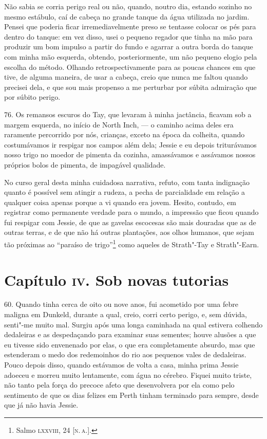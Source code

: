 Não sabia se corria perigo real ou não, quando, noutro dia, estando
sozinho no mesmo estábulo, caí de cabeça no grande tanque da água
utilizada no jardim. Pensei que poderia ficar irremediavelmente preso se
tentasse colocar os pés para dentro do tanque: em vez disso, usei o
pequeno regador que tinha na mão para produzir um bom impulso a partir
do fundo e agarrar a outra borda do tanque com minha mão esquerda,
obtendo, posteriormente, um não pequeno elogio pela escolha do método.
Olhando retrospectivamente para as poucas chances em que tive, de alguma
maneira, de usar a cabeça, creio que nunca me faltou quando precisei
dela, e que sou mais propenso a me perturbar por súbita admiração que
por súbito perigo.

76. Os remansos escuros do Tay, que levaram à minha jactância, ficavam
sob a margem esquerda, no início de North Inch, --- o caminho acima deles
era raramente percorrido por nós, crianças, exceto na época da colheita,
quando costumávamos ir respigar nos campos além dela; Jessie e eu depois
triturávamos nosso trigo no moedor de pimenta da cozinha, amassávamos e
assávamos nossos próprios bolos de pimenta, de impagável qualidade.

No curso geral desta minha cuidadosa narrativa, refuto, com tanta
indignação quanto é possível sem atingir a rudeza, a pecha de
parcialidade em relação a qualquer coisa apenas porque a vi quando era
jovem. Hesito, contudo, em registrar como permanente verdade para o
mundo, a impressão que ficou quando fui respigar com Jessie, de que as
gavelas escocesas são mais douradas que as de outras terras, e de que
não há outras plantações, aos olhos humanos, que sejam tão próximas ao
``paraíso de trigo''\footnote{Salmo \textsc{lxxviii}, 24 {[}\textsc{n.\,a.}{]}.} como
aqueles de Strath"-Tay e Strath"-Earn.

\chapter{Capítulo \textsc{iv}. Sob novas tutorias}

60. Quando tinha cerca de oito ou nove anos, fui acometido por uma febre
maligna em Dunkeld, durante a qual, creio, corri certo perigo, e, sem
dúvida, senti"-me muito mal. Surgiu após uma longa caminhada na qual
estivera colhendo dedaleiras e as despedaçando para examinar suas
sementes; houve alusões a que eu tivesse sido envenenado por elas, o que
era completamente absurdo, mas que estenderam o medo dos redemoinhos do
rio aos pequenos vales de dedaleiras. Pouco depois disso, quando
estávamos de volta a casa, minha prima Jessie adoeceu e morreu muito
lentamente, com água no cérebro. Fiquei muito triste, não tanto pela
força do precoce afeto que desenvolvera por ela como pelo sentimento de
que os dias felizes em Perth tinham terminado para sempre, desde que já
não havia Jessie.

